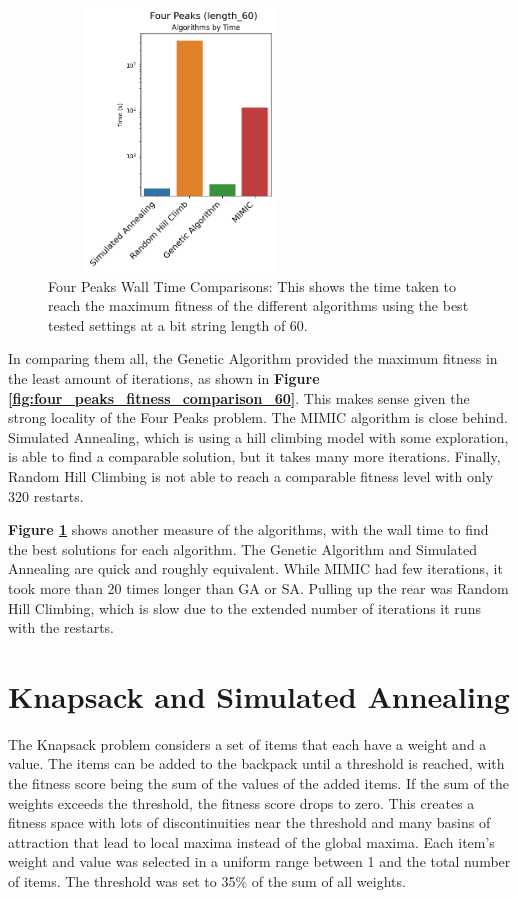 \documentclass[letterpaper]{article} %
\begin{document}
\begin{figure}[htb]
\centering
\includegraphics[width=2.75in, height=2.75in]{figures/Four_Peaks_length_60_Algorithms_by_Time_.png}
\caption{Four Peaks Wall Time Comparisons: This shows the time taken to reach the maximum fitness of the different algorithms using the best tested settings at a bit string length of 60.  }
\label{fig:four_peaks_walltime_comparison_60}
\end{figure}

In comparing them all, the Genetic Algorithm provided the maximum fitness in the least amount of iterations, as shown in \textbf{Figure \ref{fig:four_peaks_fitness_comparison_60}}.  This makes sense given the strong locality of the Four Peaks problem.  The MIMIC algorithm is close behind.  Simulated Annealing, which is using a hill climbing model with some exploration, is able to find a comparable solution, but it takes many more iterations.  Finally, Random Hill Climbing is not able to reach a comparable fitness level with only 320 restarts.

\textbf{Figure \ref{fig:four_peaks_walltime_comparison_60}} shows another measure of the algorithms, with the wall time to find the best solutions for each algorithm.  The Genetic Algorithm and Simulated Annealing are quick and roughly equivalent.  While MIMIC had few iterations, it took more than 20 times longer than GA or SA.  Pulling up the rear was Random Hill Climbing, which is slow due to the extended number of iterations it runs with the restarts.

\section{Knapsack and Simulated Annealing}
The Knapsack problem considers a set of items that each have a weight and a value.  The items can be added to the backpack until a threshold is reached, with the fitness score being the sum of the values of the added items.  If the sum of the weights exceeds the threshold, the fitness score drops to zero.  This creates a fitness space with lots of discontinuities near the threshold and many basins of attraction that lead to local maxima instead of the global maxima.   Each item's weight and value was selected in a uniform range between 1 and the total number of items.  The threshold was set to 35\% of the sum of all weights.
\end{document}
